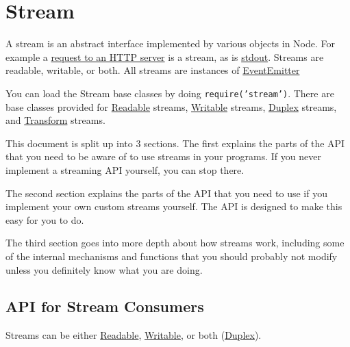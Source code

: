 \section{Stream}\label{stream}

\begin{Shaded}
\begin{Highlighting}[]
 
\end{Highlighting}
\end{Shaded}

A stream is an abstract interface implemented by various objects in
Node. For example a \href{http.html\#http_http_incomingmessage}{request
to an HTTP server} is a stream, as is
\href{process.html\#process_process_stdout}{stdout}. Streams are
readable, writable, or both. All streams are instances of
\href{events.html\#events_class_events_eventemitter}{EventEmitter}

You can load the Stream base classes by doing
\texttt{require('stream')}. There are base classes provided for
\hyperref[streamux5fclassux5fstreamux5freadable]{Readable} streams,
\hyperref[streamux5fclassux5fstreamux5fwritable]{Writable} streams,
\hyperref[streamux5fclassux5fstreamux5fduplex]{Duplex} streams, and
\hyperref[streamux5fclassux5fstreamux5ftransform]{Transform} streams.

This document is split up into 3 sections. The first explains the parts
of the API that you need to be aware of to use streams in your programs.
If you never implement a streaming API yourself, you can stop there.

The second section explains the parts of the API that you need to use if
you implement your own custom streams yourself. The API is designed to
make this easy for you to do.

The third section goes into more depth about how streams work, including
some of the internal mechanisms and functions that you should probably
not modify unless you definitely know what you are doing.

\subsection{API for Stream Consumers}\label{api-for-stream-consumers}

Streams can be either
\hyperref[streamux5fclassux5fstreamux5freadable]{Readable},
\hyperref[streamux5fclassux5fstreamux5fwritable]{Writable}, or both
(\hyperref[streamux5fclassux5fstreamux5fduplex]{Duplex}).

